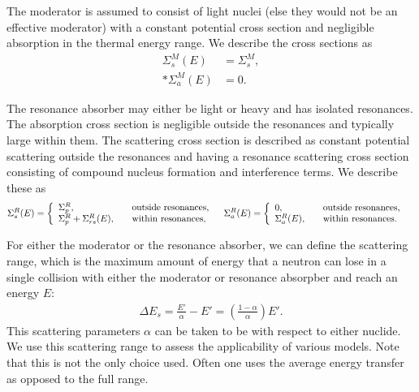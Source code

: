 The moderator is assumed to consist of light nuclei (else they would not be an effective moderator) with a constant potential cross section and negligible absorption in the thermal energy range. We describe the cross sections as
\begin{subequations}
\begin{align}
  \Sigma_s^M(E) &= \Sigma_s^M, \\*
  \Sigma_a^M(E) &= 0.
\end{align}
\end{subequations}

The resonance absorber may either be light or heavy and has isolated resonances. The absorption cross section is negligible outside the resonances and typically large within them. The scattering cross section is described as constant potential scattering outside the resonances and having a resonance scattering cross section consisting of compound nucleus formation and interference terms. We describe these as
\begin{subequations}
\begin{align}
  \Sigma_s^R(E) &= \left\{ \begin{array}{l l}
  \Sigma_p^R,					& \quad \text{outside resonances,} \\
  \Sigma_p^R + \Sigma_{rs}^R(E), & \quad \text{within resonances,}  \\ \end{array} \right.
\end{align}
\begin{align}
  \Sigma_a^R(E) &= \left\{ \begin{array}{l l}
  0,			 & \quad \text{outside resonances,} \\
  \Sigma_a^R(E), & \quad \text{within resonances.}  \\ \end{array} \right.
\end{align}
\end{subequations}

For either the moderator or the resonance absorber, we can define the scattering range, which is the maximum amount of energy that a neutron can lose in a single collision with either the moderator or resonance absorpber and reach an energy $E$:
\begin{align}
  \Delta E_s = \frac{E'}{\alpha} - E'  = \left( \frac{ 1 - \alpha }{ \alpha } \right) E' .
\end{align}
This scattering parameters $\alpha$ can be taken to be with respect to either nuclide. We use this scattering range to assess the applicability of various models. Note that this is not the only choice used. Often one uses the average energy transfer as opposed to the full range.

